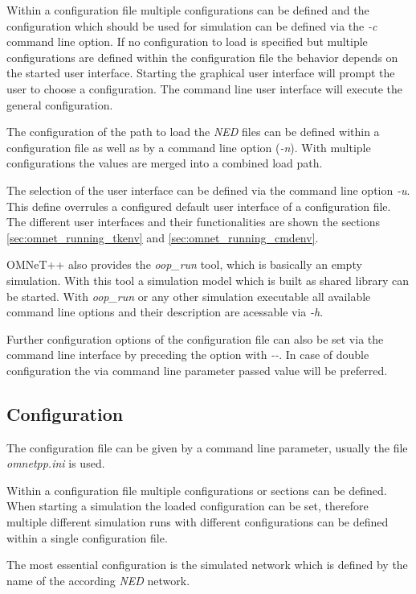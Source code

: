 Within a configuration file multiple configurations can be defined and the configuration which should be used for simulation can be defined via the \emph{-c} command line option.
If no configuration to load is specified but multiple configurations are defined within the configuration file the behavior depends on the started user interface.
Starting the graphical user interface will prompt the user to choose a configuration.
The command line user interface will execute the general configuration.

The configuration of the path to load the \emph{NED} files can be defined within a configuration file as well as by a command line option (\emph{-n}).
With multiple configurations the values are merged into a combined load path.

The selection of the user interface can be defined via the command line option \emph{-u}.
This define overrules a configured default user interface of a configuration file.
The different user interfaces and their functionalities are shown the sections \ref{sec:omnet_running_tkenv} and \ref{sec:omnet_running_cmdenv}.

OMNeT++ also provides the \emph{oop\_run} tool, which is basically an empty simulation.
With this tool a simulation model which is built as shared library can be started.
With \emph{oop\_run} or any other simulation executable all available command line options and their description are acessable via \emph{-h}.

Further configuration options of the configuration file can also be set via the command line interface by preceding the option with \emph{-{}-}.
In case of double configuration the via command line parameter passed value will be preferred. \cite[section 10.1.1, section 10.1.2]{omnet_manual}

\subsection{Configuration}
\label{sec:omnet_running_config}
The configuration file can be given by a command line parameter, usually the file \emph{omnetpp.ini} is used.

Within a configuration file multiple configurations or sections can be defined.
When starting a simulation the loaded configuration can be set, therefore multiple different simulation runs with different configurations can be defined within a single configuration file. \cite[section 9.2]{omnet_manual}

The most essential configuration is the simulated network which is defined by the name of the according \emph{NED} network.

